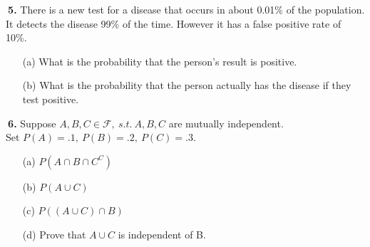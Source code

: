 \documentclass[12pt]{report}
\begin{document}
\noindent {} $~$\textbf{5.} There is a new test for a disease that occurs in about 0.01\% of the population. It detects the disease 99\% of the time. However it has a false positive rate of 10\%. 
\begin{itemize}
\item [(a)] What is the probability that the person's result is positive.		%
\item [(b)] What is the probability that the person actually has the disease if they test positive.		%
\end{itemize}
\pagebreak





\noindent {} $~$\textbf{6.} Suppose $A,B,C\in\mathcal{F},~s.t.~A,B,C$ are mutually independent. \\

Set $P(A)=.1,~P(B)=.2,~P(C)=.3$. 
\begin{itemize}
\item [(a)] $P(A\cap B \cap C^C)$ 		%
\item [(b)] $P(A\cup C)$			%
\item [(c)] $P((A\cup C)\cap B)$
\item [(d)] Prove that $A\cup C$ is independent of B.
\end{itemize}
\pagebreak
\end{document}
